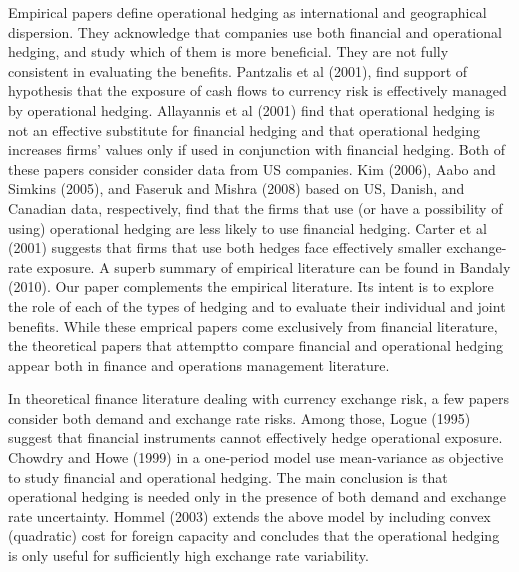 \documentclass[mnsc,nonblindrev,copyedit]{informs2_wz} %
\begin{document}
Empirical papers define operational hedging as international and geographical dispersion.  They acknowledge that companies use both financial and operational hedging, and study which of them is more beneficial.  They are not fully consistent in evaluating the benefits.   
Pantzalis et al (2001), find support of hypothesis that the exposure of cash flows to currency risk is effectively managed by operational hedging.
Allayannis et al (2001) find that operational hedging is not an effective substitute for financial hedging and that operational hedging increases firms' values only if used in conjunction with financial hedging.  Both of these papers consider consider data from US companies. 
Kim (2006), Aabo and Simkins (2005), and Faseruk and Mishra (2008) based on US, Danish, and Canadian data, respectively, find that the firms that use (or have a possibility of using) operational hedging are less likely to use financial hedging. Carter et al (2001) suggests that firms that use both hedges face effectively smaller exchange-rate exposure.  A superb summary of empirical literature can be found in Bandaly (2010).  Our paper complements the empirical literature.  Its intent is to explore the role of each of the types of hedging and to evaluate their individual and joint benefits. While these emprical papers come exclusively from financial literature, the theoretical papers that attemptto compare financial and operational hedging appear both in finance and operations management literature. 

In theoretical finance literature dealing with currency exchange risk, a few papers consider both demand and exchange rate risks.  
Among those, Logue (1995) suggest that financial instruments cannot effectively hedge operational exposure. 
Chowdry and Howe (1999) in a one-period model use mean-variance as objective to study financial and operational hedging.  The main conclusion is that operational hedging is needed only in the presence of both demand and exchange rate uncertainty.
Hommel (2003) extends the above model by including convex (quadratic) cost for foreign capacity and concludes that the operational hedging is only useful for sufficiently high exchange rate variability. 
\end{document}
